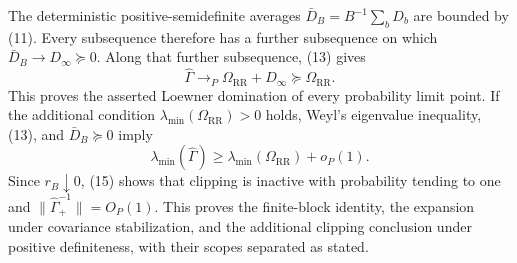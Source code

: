 The deterministic positive-semidefinite averages \(\bar D_B=B^{-1}\sum_bD_b\) are bounded by (11).  Every subsequence therefore has a further subsequence on which \(\bar D_B\to D_\infty\succeq0\).  Along that further subsequence, (13) gives
\[
 \widehat\Gamma\longrightarrow_P
 \Omega_{\mathrm{RR}}+D_\infty\succeq\Omega_{\mathrm{RR}}. \tag{14}
\]
This proves the asserted Loewner domination of every probability limit point.  If the additional condition \(\lambda_{\min}(\Omega_{\mathrm{RR}})>0\) holds, Weyl's eigenvalue inequality, (13), and \(\bar D_B\succeq0\) imply
\[
 \lambda_{\min}(\widehat\Gamma)
 \geq\lambda_{\min}(\Omega_{\mathrm{RR}})+o_P(1).          \tag{15}
\]
Since \(r_B\downarrow0\), (15) shows that clipping is inactive with probability tending to one and \(\|\widehat\Gamma_+^{-1}\|=O_P(1)\).  This proves the finite-block identity, the expansion under covariance stabilization, and the additional clipping conclusion under positive definiteness, with their scopes separated as stated.